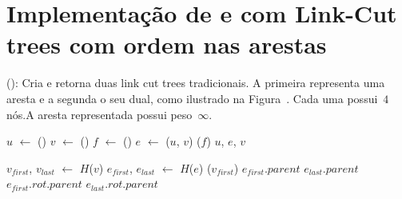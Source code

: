 \section{Implementação de \LCOSplice{} e \LCOMakeEdge{} com Link-Cut trees com ordem nas arestas}
\LCOMakeEdge(): Cria e retorna duas link cut trees tradicionais. A primeira representa uma aresta e a segunda o seu dual, como ilustrado na Figura~. Cada uma possui~$4$ nós.A aresta representada possui peso~$\infty$.


\LCOSplice{}


\begin{algorithm}[htb]
\caption{\LCOMakeEdge()}
\label{Algo:LCOMakeEdge}
\begin{algorithmic}[1]
\State $u$ $\gets$ \LCOMakeNode()
\State $v$ $\gets$ \LCOMakeNode()
\State $f$ $\gets$ \LCOMakeNode()
\State $e$ $\gets$ \LCOLink($u$, $v$)
\State \LCOLoop($f$)
\State \Return $u$, $e$, $v$ 
\end{algorithmic}
\end{algorithm}

\begin{algorithm}[htb]
\caption{\LCOFindSubNode($v$, $e$)}
\label{Algo:LCOFindSubNode}
\begin{algorithmic}[1]
\State $v_{first}$, $v_{last}$ $\gets$ $H$($v$)
\State $e_{first}$, $e_{last}$ $\gets$ $H$($e$)
\State \linkcutEvert($v_{first}$)
\State \Return $e_{first}$.$parent$
\EndIf
\State \Return $e_{last}$.$parent$
\Else
{}
\State \Return $e_{first}.rot.parent$
\Else
\State \Return $e_{last}.rot.parent$
\EndIf
\EndIf
\end{algorithmic}
\end{algorithm}

